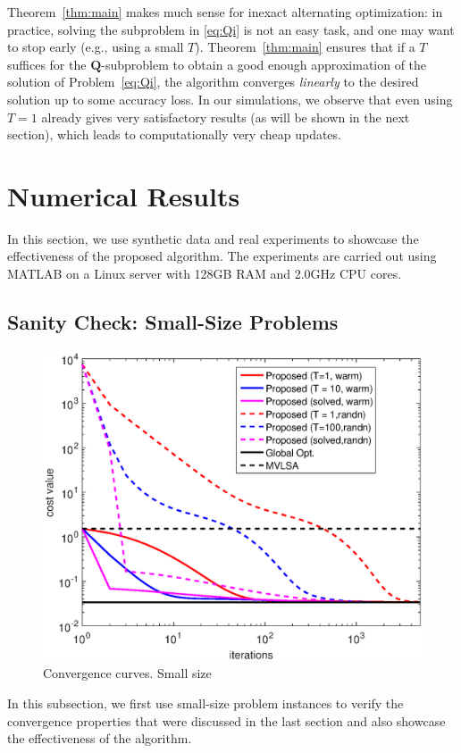 \documentclass[10pt,journal]{IEEEtran}
\newcommand{\Q}{\boldsymbol{Q}}
\begin{document}
Theorem~\ref{thm:main} makes much sense for inexact alternating optimization: in practice, solving the subproblem in \eqref{eq:Qi} is not an easy task, and one may want to stop early (e.g., using a small $T$).
Theorem~\ref{thm:main} ensures that if a $T$ suffices for the $\Q$-subproblem to obtain a good enough approximation of the solution of Problem~\eqref{eq:Qi}, the algorithm converges \textit{linearly} to the desired solution up to some accuracy loss.
In our simulations, we observe that even using $T=1$ already gives very satisfactory results (as will be shown in the next section), which leads to computationally very cheap updates.




\section{Numerical Results}

In this section, we use synthetic data and real experiments to showcase the effectiveness of the proposed algorithm.
The experiments are carried out using {MATLAB} on a Linux server with 128GB RAM and 2.0GHz CPU cores.

\subsection{Sanity Check: Small-Size Problems}

\begin{figure}[ht]
\centering
\includegraphics[width=.75\linewidth]{lambda_1.eps} 
\caption{Convergence curves. Small size}
\label{fig:subfigure1}
\end{figure}
In this subsection, we first use small-size problem instances to verify the convergence properties
that were discussed in the last section and also showcase the effectiveness of the algorithm.
\end{document}
